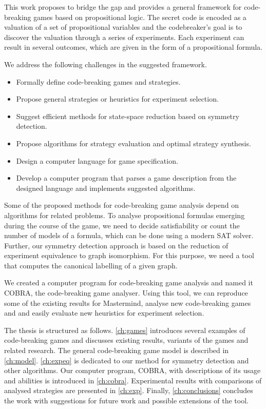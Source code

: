 This work proposes to bridge the gap and provides
  a general framework for code-breaking games
  based on propositional logic.
The secret code is encoded as a valuation of
  a set of propositional variables
  and the codebreaker's goal is to discover the valuation
  through a series of experiments.
Each experiment can result in several outcomes,
  which are given in the form of a propositional formula.

We address the following challenges in the suggested framework.
\begin{itemize}
\item Formally define code-breaking games and strategies.
\item Propose general strategies or heuristics for experiment selection.
\item Suggest efficient methods for state-space reduction based on symmetry detection.
\item Propose algorithms for strategy evaluation and optimal strategy synthesis.
\item Design a computer language for game specification.
\item Develop a computer program that parses a game description from the
  designed language and implements suggested algorithms.
\end{itemize}

Some of the proposed methods for code-breaking game analysis depend
  on algorithms for related problems.
To analyse propositional formulas emerging during the course of the game,
  we need to decide satisfiability or count the number of models of
  a formula, which can be done using a modern SAT solver.
Further, our symmetry detection approach is based on the reduction
  of experiment equivalence to graph isomorphism.
For this purpose, we need a tool that computes the canonical labelling of a
 given graph.

We created a computer program for code-breaking game analysis and named it COBRA,
  the code-breaking game analyser.
Using this tool, we can reproduce some of the existing results
  for Mastermind, analyse new code-breaking games and and easily evaluate new heuristics
  for experiment selection.

The thesis is structured as follows.
\autoref{ch:games} introduces several examples of code-breaking games and
  discusses existing results, variants of the games and related research.
The general code-breaking game model is described in \autoref{ch:model}.
\autoref{ch:expeq} is dedicated to our method for symmetry detection and other algorithms.
Our computer program, COBRA, with descriptions of its usage and
  abilities is introduced in \autoref{ch:cobra}.
Experimental results with comparisons of analysed strategies
  are presented in \autoref{ch:exp}.
Finally, \autoref{ch:conclusions} concludes the work with suggestions for future work
  and possible extensions of the tool.






